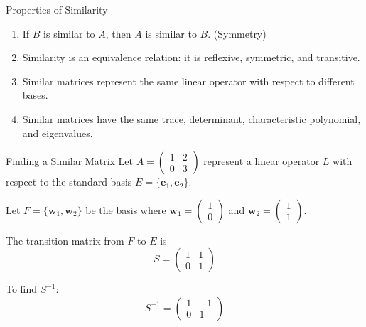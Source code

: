 \documentclass[12pt,a4paper]{article}
\newcommand{\vv}[1]{\mathbf{#1}}
\begin{document}
	\begin{remark}{Properties of Similarity}
		\begin{enumerate}[label=(\roman*)]
			\item If $B$ is similar to $A$, then $A$ is similar to $B$. (Symmetry)
			\item Similarity is an equivalence relation: it is reflexive, symmetric, and transitive.
			\item Similar matrices represent the same linear operator with respect to different bases.
			\item Similar matrices have the same trace, determinant, characteristic polynomial, and eigenvalues.
		\end{enumerate}
	\end{remark}
	
	\begin{example}{Finding a Similar Matrix}
		Let $A = \begin{pmatrix} 1 & 2 \\ 0 & 3 \end{pmatrix}$ represent a linear operator $L$ with respect to the standard basis $E = \{\vv{e}_1, \vv{e}_2\}$.
		
		Let $F = \{\vv{w}_1, \vv{w}_2\}$ be the basis where $\vv{w}_1 = \begin{pmatrix} 1 \\ 0 \end{pmatrix}$ and $\vv{w}_2 = \begin{pmatrix} 1 \\ 1 \end{pmatrix}$.
		
		The transition matrix from $F$ to $E$ is
		\[
		S = \begin{pmatrix} 1 & 1 \\ 0 & 1 \end{pmatrix}
		\]
		
		To find $S^{-1}$:
		\[
		S^{-1} = \begin{pmatrix} 1 & -1 \\ 0 & 1 \end{pmatrix}
		\]
		

\end{example}
\end{document}

